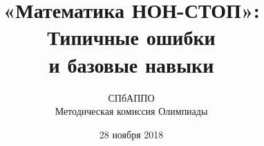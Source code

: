
\usepackage[utf8x]{inputenc}
\usepackage[russian]{babel}
\usepackage{hyperref}
\usepackage{xcolor,wrapfig,sistyle}
\usepackage{tikz,makecell,multicol}





\def\fram#1#2{\begin{frame}\frametitle{\bf #1}#2\end{frame}}
\def\scolon{\rlap{,}\raisebox{0.8ex}{,} }
\def\mitem{\medskip\item}

\def\ll{\left(} \def\rr{\right)}
\def\ps{\\ [0.8cm]}

\def\usl#1{\begin{block}{Условие} #1 \end{block} \medskip\pause}
\def\mov#1#2{\begin{scope}[xshift = #1 cm] #2 \end{scope};}


\title[Математика НОН-СТОП $\mid$ Семинар]
	{\bfseries «Математика НОН-СТОП»: \\
		Типичные ошибки \\
		и базовые навыки}

\author[Б.А.\,Золотов, Д.Г.\,Штукенберг]
	{СПбАППО \\ \vspace{0.3cm} Методическая комиссия Олимпиады}

\institute[\textcolor{white}{«Время науки», ЛНМО, СПбАППО}]{}

\date{28 ноября 2018}